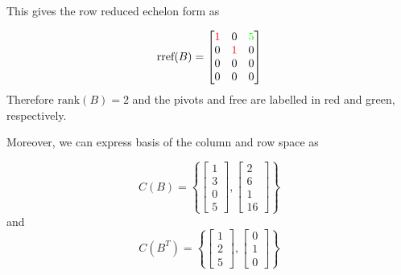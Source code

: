 This gives the row reduced echelon form as
\begin{mdframed}[style=MyFrame]
    \begin{equation}
        \text{rref}(B) = 
        \begin{bmatrix}
            {\color{red}1}              &           0           &       {\color{green}5}     \\
             0                          &     {\color{red}1}    &       0      \\
             0                          &           0           &       0      \\
             0                          &           0           &       0      
        \end{bmatrix}
    \end{equation}
    Therefore $\text{rank}(B)=2$ and the pivots and free are labelled in red and green, respectively.
\end{mdframed}
Moreover, we can express basis of the column and row space as 
\begin{mdframed}[style=MyFrame]
    \begin{equation}
        C(B) =
        \left\{
        \begin{bmatrix}
            1       \\
            3       \\
            0       \\
            5
        \end{bmatrix},
        \begin{bmatrix}
            2       \\
            6       \\
            1       \\
            16
        \end{bmatrix}
        \right\}
    \end{equation}
    and
    \begin{equation}
        C(B^{T}) =
        \left\{
        \begin{bmatrix}
            1       \\
            2       \\
            5
        \end{bmatrix},
        \begin{bmatrix}
            0       \\
            1       \\
            0
        \end{bmatrix}
        \right\}
    \end{equation}
\end{mdframed}
